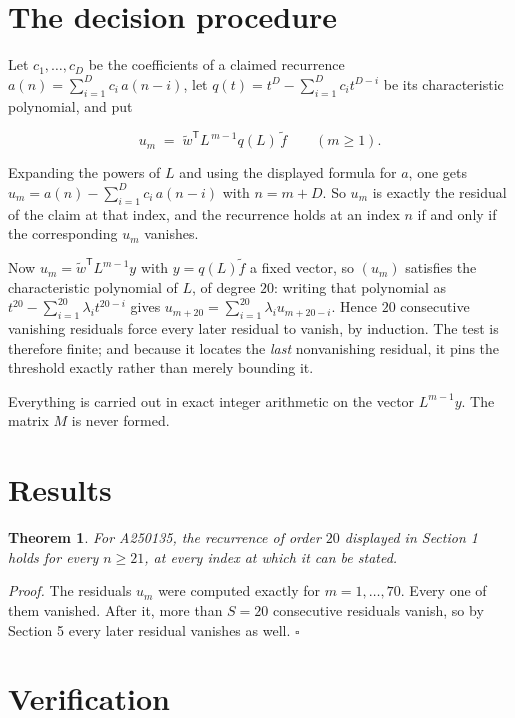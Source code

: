 \documentclass[11pt]{article}
\newtheorem{theorem}{Theorem}
\theoremstyle{definition}
\begin{document}
\section{The decision procedure}

Let $c_1,\dots,c_D$ be the coefficients of a claimed recurrence $a(n) = \sum_{i=1}^{D} c_i\,a(n-i)$, let $q(t) = t^{D} - \sum_{i=1}^{D} c_i t^{D-i}$ be its characteristic polynomial, and put

\[u_m \;=\; \tilde w^{\mathsf T} L^{\,m-1} q(L)\,\tilde f \qquad (m \ge 1).\]

Expanding the powers of $L$ and using the displayed formula for $a$, one gets $u_m = a(n) - \sum_{i=1}^{D} c_i\,a(n-i)$ with $n = m + D$. So $u_m$ is exactly the residual of the claim at that index, and the recurrence holds at an index $n$ if and only if the corresponding $u_m$ vanishes.

Now $u_m = \tilde w^{\mathsf T} L^{m-1} y$ with $y = q(L)\tilde f$ a fixed vector, so $(u_m)$ satisfies the characteristic polynomial of $L$, of degree $20$: writing that polynomial as $t^{20} - \sum_{i=1}^{20} \lambda_i t^{20-i}$ gives $u_{m+20} = \sum_{i=1}^{20} \lambda_i u_{m+20-i}$. Hence $20$ consecutive vanishing residuals force every later residual to vanish, by induction. The test is therefore finite; and because it locates the {\itshape last} nonvanishing residual, it pins the threshold exactly rather than merely bounding it.

Everything is carried out in exact integer arithmetic on the vector $L^{m-1}y$. The matrix $M$ is never formed.

\section{Results}

\begin{theorem} For A250135, the recurrence of order $20$ displayed in Section 1 holds for every $n \ge 21$, at every index at which it can be stated.\end{theorem}

{\itshape Proof.} The residuals $u_m$ were computed exactly for $m = 1,\dots,70$. Every one of them vanished. After it, more than $S = 20$ consecutive residuals vanish, so by Section 5 every later residual vanishes as well. $\square$

\section{Verification}
\end{document}
